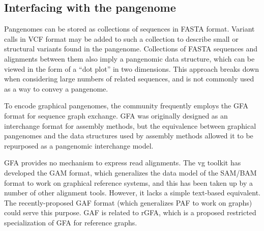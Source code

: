


\subsection{Interfacing with the pangenome}

Pangenomes can be stored as collections of sequences in FASTA format.
Variant calls in VCF format may be added to such a collection to describe small or structural variants found in the pangenome.
Collections of FASTA sequences and alignments between them also imply a pangenomic data structure, which can be viewed in the form of a ``dot plot'' in two dimensions.
This approach breaks down when considering large numbers of related sequences, and is not commonly used as a way to convey a pangenome.

To encode graphical pangenomes, the community frequently employs the GFA format for sequence graph exchange.
GFA was originally designed as an interchange format for assembly methods, but the equivalence between graphical pangenomes and the data structures used by assembly methods allowed it to be repurposed as a pangenomic interchange model.

GFA provides no mechanism to express read alignments.
The vg toolkit has developed the GAM format, which generalizes the data model of the SAM/BAM format to work on graphical reference systems, and this has been taken up by a number of other alignment tools.
However, it lacks a simple text-based equivalent.
The recently-proposed GAF format (which generalizes PAF to work on graphs) could serve this purpose.
GAF is related to rGFA, which is a proposed restricted specialization of GFA for reference graphs.


